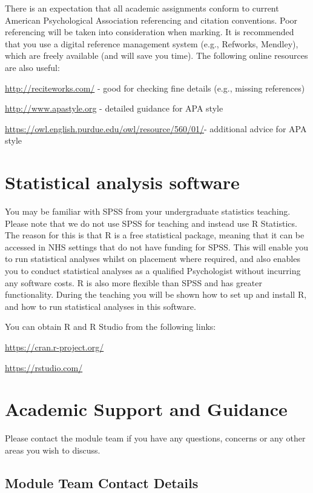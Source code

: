 \documentclass[
]{book}
\begin{document}
There is an expectation that all academic assignments conform to current American Psychological Association referencing and citation conventions. Poor referencing will be taken into consideration when marking. It is recommended that you use a digital reference management system (e.g., Refworks, Mendley), which are freely available (and will save you time). The following online resources are also useful:

\url{http://reciteworks.com/} - good for checking fine details (e.g., missing references)

\url{http://www.apastyle.org} - detailed guidance for APA style

\url{https://owl.english.purdue.edu/owl/resource/560/01/}- additional advice for APA style

\hypertarget{statistical-analysis-software}{%
\chapter{Statistical analysis software}\label{statistical-analysis-software}}

You may be familiar with SPSS from your undergraduate statistics teaching. Please note that we do not use SPSS for teaching and instead use R Statistics. The reason for this is that R is a free statistical package, meaning that it can be accessed in NHS settings that do not have funding for SPSS. This will enable you to run statistical analyses whilst on placement where required, and also enables you to conduct statistical analyses as a qualified Psychologist without incurring any software costs. R is also more flexible than SPSS and has greater functionality. During the teaching you will be shown how to set up and install R, and how to run statistical analyses in this software.

You can obtain R and R Studio from the following links:

\url{https://cran.r-project.org/}

\url{https://rstudio.com/}

\hypertarget{academic-support-and-guidance}{%
\chapter{Academic Support and Guidance}\label{academic-support-and-guidance}}

Please contact the module team if you have any questions, concerns or any other areas you wish to discuss.

\hypertarget{module-team-contact-details}{%
\section{Module Team Contact Details}\label{module-team-contact-details}}
\end{document}
